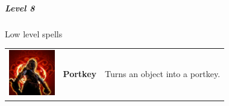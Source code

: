 \subparagraph{Level 8} 
Low level spells \\
\begin{tabular}{ m{2cm}m{3cm}m{8cm} } 
  	\includegraphics[width=2cm]{../Pictures/Gameplay/Spells/Icon/spell_icon.png} & \textbf{Portkey} & Turns an object into a portkey.\\ 
\end{tabular}


\pagebreak









